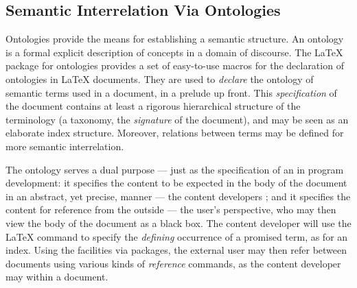 \subsection{Semantic Interrelation Via Ontologies}

Ontologies provide the means for establishing a semantic structure. An
ontology is a formal explicit description of concepts in a domain of discourse. The
{\MMISS\LaTeX} package for ontologies provides a set of easy-to-use macros for the
declaration of ontologies in {\LaTeX} documents. They are used to {\emph{declare}} the
ontology of semantic terms used in a document, in a prelude up front. This
{\emph{specification}} of the document contains at least a rigorous hierarchical structure
of the terminology (a taxonomy, the {\emph{signature}} of the document), and may be seen
as an elaborate index structure. Moreover, relations between terms may be defined for more
semantic interrelation.

The ontology serves a dual purpose --- just as the specification of an
{} in program development: it specifies the content to be
expected in the body of the document in an abstract, yet precise, manner --- the content
developers {}; and it specifies the content for
reference from the outside --- the user's perspective, who may then view the body of the
document as a black box. The content developer will use the {\MMISS\LaTeX} {}
command to specify the {\emph{defining}} occurrence of a promised term, as for an
index. Using the {} facilities via packages, the
external user may then refer between documents using various kinds of {\emph{reference}}
commands, as the content developer may within a document.


